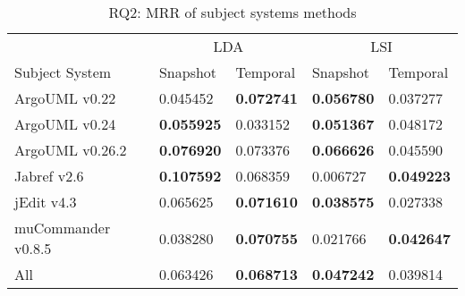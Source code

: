 \begin{table}[t]
\renewcommand{\arraystretch}{1.3}
\centering
\caption{RQ2: MRR of subject systems methods}
\begin{tabular}{l|ll|ll}
    \toprule
                        & \multicolumn{2}{c|}{LDA}      &  \multicolumn{2}{c}{LSI}  \\
    Subject System      & Snapshot      & Temporal      & Snapshot      & Temporal  \\
    \midrule
ArgoUML v0.22 & 0.045452 & {\bf 0.072741 } & {\bf 0.056780 } & 0.037277 \\
ArgoUML v0.24 & {\bf 0.055925 } & 0.033152 & {\bf 0.051367 } & 0.048172 \\
ArgoUML v0.26.2 & {\bf 0.076920 } & 0.073376 & {\bf 0.066626 } & 0.045590 \\
Jabref v2.6 & {\bf 0.107592 } & 0.068359 & 0.006727 & {\bf 0.049223 } \\
jEdit v4.3 & 0.065625 & {\bf 0.071610 } & {\bf 0.038575 } & 0.027338 \\
muCommander v0.8.5 & 0.038280 & {\bf 0.070755 } & 0.021766 & {\bf 0.042647 } \\
    \midrule
All & 0.063426 & {\bf 0.068713 } & {\bf 0.047242 } & 0.039814 \\
    \bottomrule
\end{tabular}
\label{table:rq2:methods}
\end{table}

